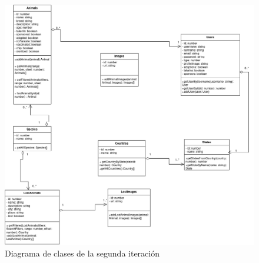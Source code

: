 \begin{figure}[H]
	\centering
	\includegraphics[width=1\linewidth]{"sprint 2/clases"}
	\caption{Diagrama de clases de la segunda iteración}
	\label{fig:clases2}
\end{figure}



















